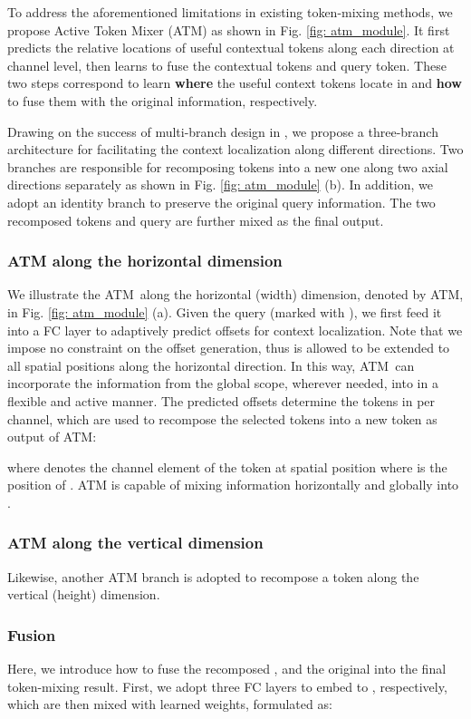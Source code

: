 \documentclass[letterpaper]{article} \usepackage{aaai23v}  \usepackage{times}  \usepackage{helvet}  \usepackage{courier}  \usepackage[hyphens]{url}  \usepackage{graphicx} \urlstyle{rm} \def\UrlFont{\rm}  \usepackage{caption} \frenchspacing  \setlength{\pdfpagewidth}{8.5in}  \setlength{\pdfpageheight}{11in}  \usepackage{algorithm}
\newcommand{\ourop}{{ATM}}
\begin{document}
To address the aforementioned limitations in existing token-mixing methods, we propose Active Token Mixer (\ourop) as shown in Fig. \ref{fig: atm_module}. 
It first predicts the relative locations of useful contextual tokens along each direction at channel level, then learns to fuse the contextual tokens and query token.
These two steps correspond to learn \textbf{where} the useful context tokens locate in and \textbf{how} to fuse them with the original information, respectively.

Drawing on the success of multi-branch design in \cite{hou2021visionvip,chen2022cyclemlp,lian2021asmlp}, we propose a three-branch architecture for facilitating the context localization along different directions.
Two branches are responsible for recomposing tokens into a new one along two axial directions separately as shown in Fig. \ref{fig: atm_module} (b). In addition, we adopt an identity branch to preserve the original query information.
The two recomposed tokens and query are further mixed as the final output. 

\subsubsection{ATM along the horizontal dimension}
We illustrate the \ourop~along the horizontal (width) dimension, denoted by ATM, in Fig. \ref{fig: atm_module} (a).
Given the query  (marked with ), we first feed it into a FC layer to adaptively predict  offsets  for context localization.  
Note that we impose no constraint on the offset generation, thus  is allowed to be extended to all spatial positions along the horizontal direction. In this way, \ourop~can incorporate the information from the global scope, wherever needed, into  in a flexible and active manner. The predicted offsets determine the
tokens in  per channel, which
are used to recompose the selected tokens into a new token 
as output of ATM:

where  denotes the  channel element of the token at spatial position  where  is the position of . 
ATM is capable of mixing information horizontally and globally into .

\subsubsection{ATM along the vertical dimension}
Likewise, another ATM branch 
is adopted to recompose a token \textbf{} along the vertical (height) dimension.

\subsubsection{Fusion}
Here, we introduce how to fuse the recomposed ,  and the original  
into the final token-mixing result. 
First, we adopt three FC layers  to embed 
to , respectively, which are then mixed with learned weights, formulated as:
\end{document}

